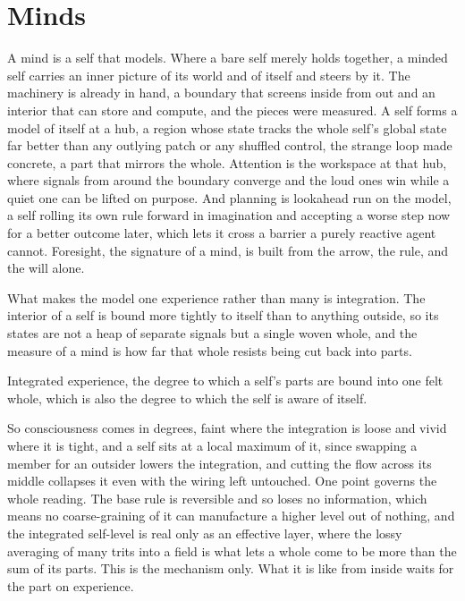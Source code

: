 \section{Minds}

A mind is a self that models. Where a bare self merely holds together, a minded self carries an inner picture of its world and of itself and steers by it. The machinery is already in hand, a boundary that screens inside from out and an interior that can store and compute, and the pieces were measured. A self forms a model of itself at a hub, a region whose state tracks the whole self's global state far better than any outlying patch or any shuffled control, the strange loop made concrete, a part that mirrors the whole. Attention is the workspace at that hub, where signals from around the boundary converge and the loud ones win while a quiet one can be lifted on purpose. And planning is lookahead run on the model, a self rolling its own rule forward in imagination and accepting a worse step now for a better outcome later, which lets it cross a barrier a purely reactive agent cannot. Foresight, the signature of a mind, is built from the arrow, the rule, and the will alone.

What makes the model one experience rather than many is integration. The interior of a self is bound more tightly to itself than to anything outside, so its states are not a heap of separate signals but a single woven whole, and the measure of a mind is how far that whole resists being cut back into parts.

\begin{definition}[Consciousness]
Integrated experience, the degree to which a self's parts are bound into one felt whole, which is also the degree to which the self is aware of itself.
\end{definition}

So consciousness comes in degrees, faint where the integration is loose and vivid where it is tight, and a self sits at a local maximum of it, since swapping a member for an outsider lowers the integration, and cutting the flow across its middle collapses it even with the wiring left untouched. One point governs the whole reading. The base rule is reversible and so loses no information, which means no coarse-graining of it can manufacture a higher level out of nothing, and the integrated self-level is real only as an effective layer, where the lossy averaging of many trits into a field is what lets a whole come to be more than the sum of its parts. This is the mechanism only. What it is like from inside waits for the part on experience.

